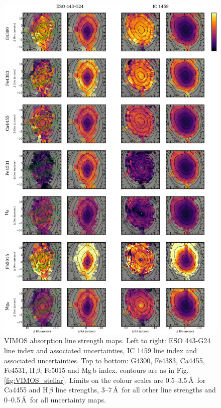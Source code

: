 		\begin{figure}
			\centering
			\includegraphics[height=0.89\textheight]{chapter4/vimos/abs1.png}
			\caption[VIMOS absorption line strength maps]{VIMOS absorption line strength maps. Left to right: ESO 443-G24 line index and associated uncertainties, IC 1459 line index and associated uncertainties. Top to bottom: G4300, Fe4383, Ca4455, Fe4531, H\,$\beta$, Fe5015 and Mg\,b index. contours are as in Fig.\,\ref{fig:VIMOS_stellar}. Limits on the colour scales are 0.5--3.5\,\AA\ for Ca4455 and H\,$\beta$ line strengths, 3--7\,\AA\ for all other line strengths and 0--0.5\,\AA\ for all uncertainty maps.}
			\label{fig:VIMOS_absorption}
		\end{figure}
